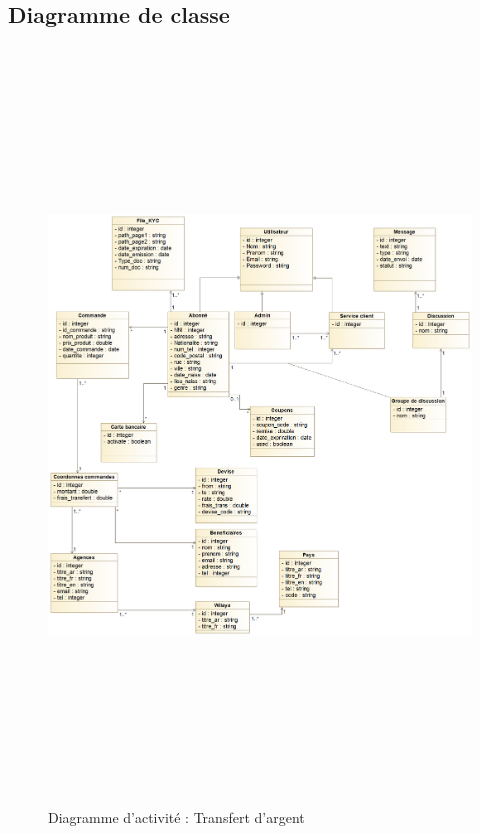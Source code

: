 \subsection{Diagramme de classe}
\begin{figure}[h!]
	\includegraphics[width=18cm, height=20cm]{./Template LaTeX/Images/Diagramme_de_classe.png}
	\caption{Diagramme d'activité : Transfert d'argent}
	\label{fig3:class}
\end{figure}


